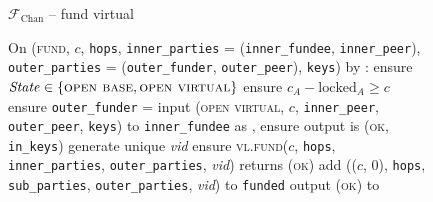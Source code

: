 \begin{figure}[H]
  \begin{systembox}{$\mathcal{F}_{\mathrm{Chan}}$ -- fund virtual}
    \begin{algorithmic}[1]
      \State On (\textsc{fund}, $c$, \texttt{hops}, \texttt{inner\_parties} =
      (\texttt{inner\_fundee}, \texttt{inner\_peer}), \texttt{outer\_parties} =
      (\texttt{outer\_funder}, \texttt{outer\_peer}), \texttt{keys}) by \alice:
      \label{code:functionality:chan:skeleton:virtual:fund}
      \Indent
        \State ensure $\mathit{State} \in \{\textsc{open base}, \textsc{open
        virtual}\}$
        \State ensure $c_A - \mathrm{locked}_A \geq c$
        \State ensure \texttt{outer\_funder} = \alice
        \State input (\textsc{open virtual}, $c$, \texttt{inner\_peer},
        \texttt{outer\_peer}, \texttt{keys}) to \texttt{inner\_fundee} as
        \alice, ensure output is (\textsc{ok}, \texttt{in\_keys})
        \label{code:functionality:chan:skeleton:virtual:subfunc}
        \State generate unique \textit{vid}
        \label{code:functionality:chan:skeleton:virtual:id}
        \State ensure \textsc{vl.fund}($c$, \texttt{hops},
        \texttt{inner\_parties}, \texttt{outer\_parties}, \textit{vid}) returns
        (\textsc{ok})
        \label{code:functionality:chan:skeleton:virtual:fund:vl}
        \State add (($c$, 0), \texttt{hops}, \texttt{sub\_parties},
        \texttt{outer\_parties}, \textit{vid}) to \texttt{funded}
        \label{code:functionality:chan:skeleton:virtual:fund:store}
        \State output (\textsc{ok}) to \alice
      \EndIndent
    \end{algorithmic}
  \end{systembox}
  \caption{}
  \label{code:functionality:chan:skeleton:virtual:fund:fig}
\end{figure}

